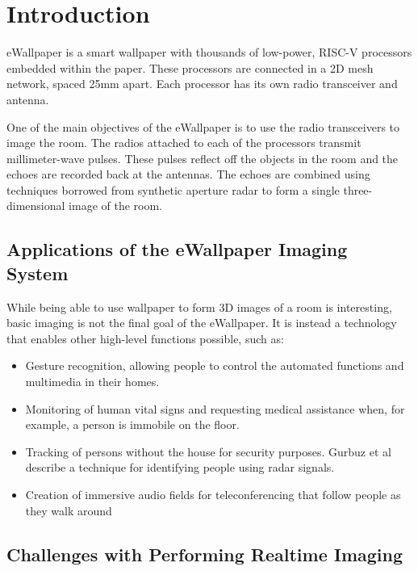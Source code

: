 \section{Introduction}

eWallpaper is a smart wallpaper with thousands of low-power, RISC-V \cite{riscv} processors embedded within the paper. These processors are connected in a 2D mesh network, spaced 25mm apart. Each processor has its own radio transceiver and antenna.

One of the main objectives of the eWallpaper is to use the radio transceivers to image the room. The radios attached to each of the processors transmit millimeter-wave pulses. These pulses reflect off the objects in the room and the echoes are recorded back at the antennas. The echoes are combined using techniques borrowed from synthetic aperture radar to form a single three-dimensional image of the room.

\subsection{Applications of the eWallpaper Imaging System}

While being able to use wallpaper to form 3D images of a room is interesting, basic imaging is not the final goal of the eWallpaper. It is instead a technology that enables other high-level functions possible, such as:

\begin{itemize}
\item Gesture recognition, allowing people to control the automated functions and multimedia in their homes.
\item Monitoring of human vital signs and requesting medical assistance when, for example, a person is immobile on the floor.
\item Tracking of persons without the house for security purposes. Gurbuz et al \cite{human-recognition} describe a technique for identifying people using radar signals.
\item Creation of immersive audio fields for teleconferencing \cite{immersive-audio} that follow people as they walk around
\end{itemize}

\subsection{Challenges with Performing Realtime Imaging}

